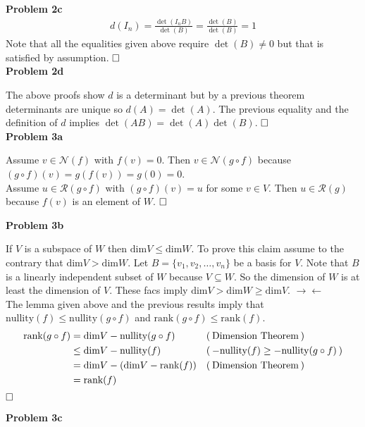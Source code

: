 \documentclass[fleqn]{article}
\newcommand{\problem}[1]{\large\textbf{Problem #1}\normalsize}
\newcommand{\evidence}[1]{\ensuremath{(\hspace{0.2em} \text{#1} \hspace{0.2em})}}
\newcommand{\qed}{\hfill\ensuremath{\square}}
\newcommand{\rankF}[1]{\ensuremath{\text{rank}(#1)}}
\newcommand{\nullityF}[1]{\ensuremath{\text{nullity}(#1)}}
\begin{document}
\problem{2c}
\begin{align*}
  d(I_n) = \frac{\det(I_nB)}{\det(B)} = \frac{\det(B)}{\det(B)} = 1
\end{align*}
Note that all the equalities given above require $\det(B) \neq 0$ but that is satisfied
by assumption. $\qed$ \\

\problem{2d}

The above proofs show $d$ is a determinant but by a previous theorem
determinants are unique so $d(A) = \det(A)$. The previous equality
and the definition of $d$ implies $\det(AB) = \det(A)\det(B)$. $\qed$ \\

\problem{3a}

Assume $v \in \mathcal{N}(f)$ with $f(v) = 0$.
Then $v \in \mathcal{N}(g \circ f)$ because
$(g \circ f)(v) = g(f(v)) = g(0) = 0$. \\

Assume $u \in \mathcal{R}(g \circ f)$ with $(g \circ f)(v) = u$ for some $v \in
V$. Then $u \in \mathcal{R}(g)$ because $f(v)$ is an element of $W$. $\qed$ \\

\newpage

\problem{3b}

If $V$ is a subspace of $W$ then $\text{dim} V \leq \text{dim} W$. To prove this
claim assume to the contrary that $\text{dim} V > \text{dim} W$.
Let $B = \{ v_1, v_2, \dots, v_n \}$ be a basis for $V$. Note
that $B$ is a linearly independent subset of $W$ because $V \subseteq W$.
So the dimension of $W$ is at least the dimension of $V$. These facs imply
$\text{dim} V > \text{dim} W \geq \text{dim} V$.
$\rightarrow\leftarrow$ \\

The lemma given above and the previous results imply that
$\nullityF{f} \leq \nullityF{g \circ f}$
and $\rankF{g \circ f} \leq \rankF{f}$.
\begin{align*}
  \rankF{g \circ f}
     &= \text{dim} V - \nullityF{g \circ f}
     && \evidence{Dimension Theorem} \\
  {} &\leq \text{dim} V - \nullityF{f}
     && \evidence{$-\nullityF{f} \geq -\nullityF{g \circ f}$} \\
  {} &= \text{dim} V - (\text{dim} V - \rankF{f})
     && \evidence{Dimension Theorem} \\
  {} &= \rankF{f}
\end{align*} $\qed$

\problem{3c}
\end{document}
